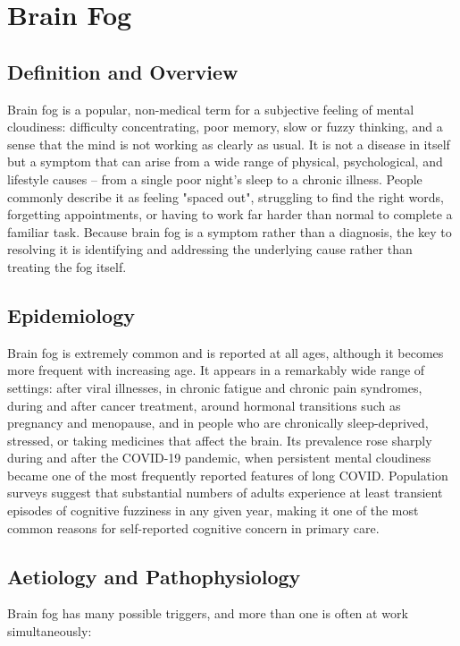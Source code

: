 \chapter{Brain Fog}

\section*{Definition and Overview}
Brain fog is a popular, non-medical term for a subjective feeling of mental cloudiness: difficulty concentrating, poor memory, slow or fuzzy thinking, and a sense that the mind is not working as clearly as usual. It is not a disease in itself but a symptom that can arise from a wide range of physical, psychological, and lifestyle causes -- from a single poor night's sleep to a chronic illness. People commonly describe it as feeling "spaced out", struggling to find the right words, forgetting appointments, or having to work far harder than normal to complete a familiar task. Because brain fog is a symptom rather than a diagnosis, the key to resolving it is identifying and addressing the underlying cause rather than treating the fog itself.

\section*{Epidemiology}
Brain fog is extremely common and is reported at all ages, although it becomes more frequent with increasing age. It appears in a remarkably wide range of settings: after viral illnesses, in chronic fatigue and chronic pain syndromes, during and after cancer treatment, around hormonal transitions such as pregnancy and menopause, and in people who are chronically sleep-deprived, stressed, or taking medicines that affect the brain. Its prevalence rose sharply during and after the COVID-19 pandemic, when persistent mental cloudiness became one of the most frequently reported features of long COVID. Population surveys suggest that substantial numbers of adults experience at least transient episodes of cognitive fuzziness in any given year, making it one of the most common reasons for self-reported cognitive concern in primary care.

\section*{Aetiology and Pathophysiology}
Brain fog has many possible triggers, and more than one is often at work simultaneously:

